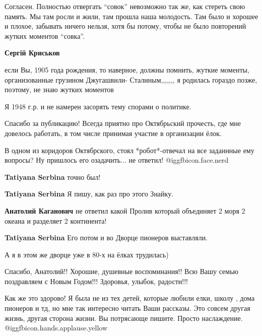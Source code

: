 \begin{itemize}

Согласен. Полностью отвергать \enquote{совок} невозможно так же, как стереть свою
память. Мы там росли и жили, там прошла наша молодость. Там было и хорошее и
плохое, забывать ничего нельзя, хотя бы потому, чтобы не было повторений жутких
моментов \enquote{совка}.

\begin{itemize} %
\textbf{Сергій Криськов} 

если Вы, 1905 года рождения, то наверное, должны помнить, жуткие моменты,
организованные грузином Джугашвили- Сталиным,,,,,,, я родилась гораздо позже,
поэтому, не знаю жутких моментов


Я 1948 г.р. и не намерен засорять тему спорами о политике.
\end{itemize} %


Спасибо за публикацию! Всегда приятно про Октябрьский прочесть, где мне
довелось работать, в том числе принимая участие в организации ёлок.



В одном из коридоров Октябрского, стоял *робот*-отвечал на все заданнные ему
вопросы? Ну пришлось его озадачить... не ответил! @igg{fbicon.face.nerd} 

\begin{itemize} %
\textbf{Tatiyana Serbina} точно был!

\textbf{Tatiyana Serbina} Я пишу, как раз про этого Знайку.

\textbf{Анатолий Каганович} не ответил какой Пролив который объединяет 2 моря 2 океана и разделяет 2 континента!

\textbf{Tatiyana Serbina}
Его потом и во Дворце пионеров выставляли.
\end{itemize} %

А я в этом же дворце уже в 80-х на ёлках трудилась)


Спасибо, Анатолий!! Хорошие, душевные воспоминания!! Всю Вашу семью поздравляем
с Новым Годом!!! Здоровья, улыбок, радости!!!


Как же это здорово! Я была не из тех детей, которые любили елки, школу , дома
пионеров и тд, но мне так интересно читать Ваши рассказы. Это совсем другая
жизнь, другая сторона жизни. Вы потрясающе пишите. Просто наслаждение.
@igg{fbicon.hands.applause.yellow} 

\end{itemize} %
